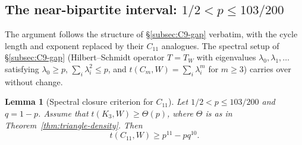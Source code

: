 \documentclass[11pt]{article}
\newtheorem{lemma}[theorem]{Lemma}
\begin{document}
\subsection{The near-bipartite interval: $1/2<p\le103/200$}\label{subsec:C11-gap}

The argument follows the structure of \S\ref{subsec:C9-gap} verbatim, with the cycle length and exponent replaced by their $C_{11}$ analogues.  The spectral setup of \S\ref{subsec:C9-gap} (Hilbert--Schmidt operator $T=T_W$ with eigenvalues $\lambda_0,\lambda_1,\ldots$ satisfying $\lambda_0\ge p$, $\sum_i\lambda_i^2\le p$, and $t(C_m,W)=\sum_i\lambda_i^m$ for $m\ge3$) carries over without change.

\begin{lemma}[Spectral closure criterion for $C_{11}$]\label{lem:spectral-closure-C11}
Let $1/2<p\le103/200$ and $q=1-p$.  Assume that $t(K_3,W)\ge\Theta(p)$, where $\Theta$ is as in Theorem~\ref{thm:triangle-density}.  Then
\[
        t(C_{11},W)\ge p^{11}-pq^{10}.
\]
\end{lemma}
\end{document}
